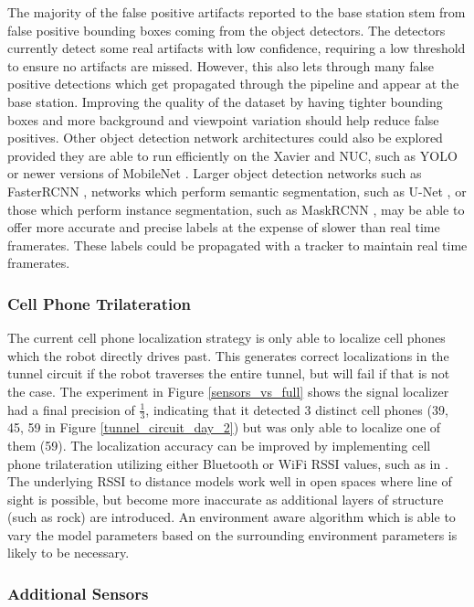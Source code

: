 The majority of the false positive artifacts reported to the base station stem from false positive bounding boxes coming from the object detectors. The detectors currently detect some real artifacts with low confidence, requiring a low threshold to ensure no artifacts are missed. However, this also lets through many false positive detections which get propagated through the pipeline and appear at the base station. Improving the quality of the dataset by having tighter bounding boxes and more background and viewpoint variation should help reduce false positives. Other object detection network architectures could also be explored provided they are able to run efficiently on the Xavier and NUC, such as YOLO \cite{redmon2018yolov3} or newer versions of MobileNet \cite{howard2019searching}. Larger object detection networks such as FasterRCNN \cite{ren2015faster}, networks which perform semantic segmentation, such as U-Net \cite{ronneberger2015u}, or those  which perform instance segmentation, such as MaskRCNN \cite{he2017mask}, may be able to offer more accurate and precise labels at the expense of slower than real time framerates. These labels could be propagated with a tracker to maintain real time framerates.

\subsubsection{Cell Phone Trilateration}

The current cell phone localization strategy is only able to localize cell phones which the robot directly drives past. This generates correct localizations in the tunnel circuit if the robot traverses the entire tunnel, but will fail if that is not the case. The experiment in Figure \ref{sensors_vs_full} shows the signal localizer had a final precision of $\frac{1}{3}$, indicating that it detected 3 distinct cell phones (39, 45, 59 in Figure \ref{tunnel_circuit_day_2}) but was only able to localize one of them (59). The localization accuracy can be improved by implementing cell phone trilateration utilizing either Bluetooth or WiFi RSSI values, such as in \cite{iglesias2012indoor}. The underlying RSSI to distance models work well in open spaces where line of sight is possible, but become more inaccurate as additional layers of structure (such as rock) are introduced. An environment aware algorithm which is able to vary the model parameters based on the surrounding environment parameters is likely to be necessary.

\subsubsection{Additional Sensors}

